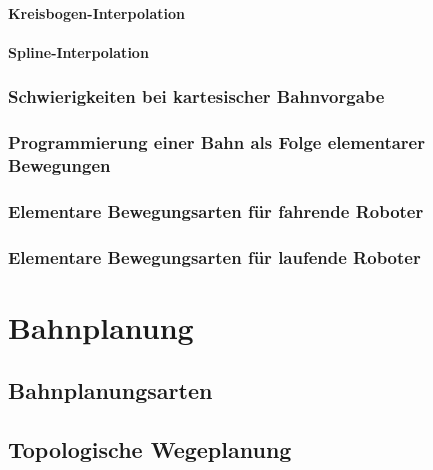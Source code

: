 \documentclass[a4paper, 11pt, accentcolor = tud3b]{tudreport}
\begin{document}
				\subsubsection{Kreisbogen-Interpolation} %

				\subsubsection{Spline-Interpolation} %

			\subsection{Schwierigkeiten bei kartesischer Bahnvorgabe} %

			\subsection{Programmierung einer Bahn als Folge elementarer Bewegungen} %

			\subsection{Elementare Bewegungsarten für fahrende Roboter} %

			\subsection{Elementare Bewegungsarten für laufende Roboter} %

	\chapter{Bahnplanung} %

		\section{Bahnplanungsarten} %

		\section{Topologische Wegeplanung} %
\end{document}
